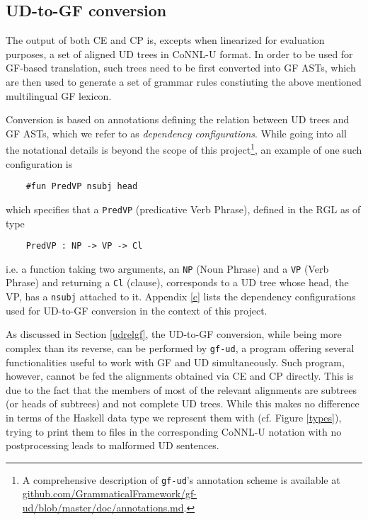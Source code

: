 \subsection{UD-to-GF conversion}
The output of both CE and CP is, excepts when linearized for evaluation purposes, a set of aligned UD trees in CoNNL-U format. 
In order to be used for GF-based translation, such trees need to be first converted into GF ASTs, which are then used to generate a set of grammar rules constiuting the above mentioned multilingual GF lexicon. \smallskip

Conversion is based on annotations defining the relation between UD trees and GF ASTs, which we refer to as \textit{dependency configurations}. 
While going into all the notational details is beyond the scope of this project\footnote{A comprehensive description of \texttt{gf-ud}'s annotation scheme is available at \url{github.com/GrammaticalFramework/gf-ud/blob/master/doc/annotations.md}.}, an example of one such configuration is 

\begin{verbatim}
    #fun PredVP	nsubj head
\end{verbatim}

which specifies that a \texttt{PredVP} (predicative Verb Phrase), defined in the RGL as of type

\begin{verbatim}
    PredVP : NP -> VP -> Cl
\end{verbatim}

i.e. a function taking two arguments, an \texttt{NP} (Noun Phrase) and a \texttt{VP} (Verb Phrase) and returning a \texttt{Cl} (clause), corresponds to a UD tree whose head, the VP, has a \texttt{nsubj} attached to it. Appendix \ref{c} lists the dependency configurations used for UD-to-GF conversion in the context of this project.
\smallskip

As discussed in Section \ref{udrelgf}, the UD-to-GF conversion, while being more complex than its reverse, can be performed by \texttt{gf-ud}, a program offering several functionalities useful to work with GF and UD simultaneously.
Such program, however, cannot be fed the alignments obtained via CE and CP directly. 
This is due to the fact that the members of most of the relevant alignments are subtrees (or heads of subtrees) and not complete UD trees. 
While this makes no difference in terms of the Haskell data type we represent them with (cf. Figure \ref{types}), trying to print them to files in the corresponding CoNNL-U notation with no postprocessing leads to malformed UD sentences. \smallskip

